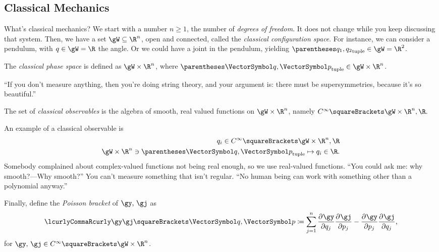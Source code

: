 \documentclass[10pt, a4paper, twoside]{lecturenotes}
\newcommand{\Rn}{{\R^n}}
\begin{document}
\subsection{Classical Mechanics}
\begin{lecture}[date=2013-04-11]
What's classical mechanics? We start with a number $n\geq 1$, the number of \emph{degrees of freedom}. It does not change while you keep discussing that system. Then, we have a set $\gW \Subset \Rn$, open and connected, called the \emph{classical configuration space}.
For instance, we can consider a pendulum, with $q\in\gW = \R$ the angle. Or we could have a joint in the pendulum, yielding $\tuple{q_1,q_2}\in\gW=\R^2$.
\marginfig[The configuration space $\gW=\R$ of a simple pendulum. Here $q\in\R$, as the pendulum can do a full turn---or several---around its pivot.]{\FigureSimplePendulumConfigurationSpace}
\marginfig[The configuration space $\gW=\R^2$ of a double pendulum, where $\vq=\tuple{q_1,q_2}\in\R^2$.]{\FigureDoublePendulumConfigurationSpace}
\marginpar{\vspace*{3cm}}
\begin{definition} The \emph{classical phase space} is defined as $\gW \Cartesian \Rn$, where $\tuple{\vq,\vp}\in\gW \Cartesian \Rn$.
\end{definition}
``If you don't measure anything, then you're doing string theory, and your argument is: there must be supersymmetries, because it's so beautiful.''
\begin{definition} The set of \emph{classical observables} is the algebra of smooth, real valued functions on $\gW\Cartesian\Rn$, namely $\Continf\of{\gW\Cartesian\Rn, \R} \text.$
\end{definition}
An example of a classical observable is
\begin{align*}
q_i\in\Continf\of{\gW\Cartesian\Rn, \R}\\
\FunctionBody{\gW\Cartesian\Rn\owns\tuple{\vq,\vp}}{q_i\in\R}\text.
\end{align*}
Somebody complained about complex-valued functions not being real enough, so we use real-valued functions.
``You could ask me: why smooth?---Why smooth?'' You can't measure something that isn't regular. ``No human being can work with something other than a polynomial anyway.''
\begin{definition}
Finally, define the \emph{Poisson bracket} of $\gy\text{, }\gj$ as
\[
\Poisson{\gy}{\gj}\of{\vq,\vp} \DefineAs \sum{j=1}[n]{\pderiv {q_j}\gy \pderiv {p_j} \gj-\pderiv {p_j}\gy \pderiv {q_j}\gj}
\text,
\]
for $\gy\text{, }\gj\in\Continf\of{\gW\Cartesian\Rn}$.
\end{definition}


\end{lecture}
\end{document}

